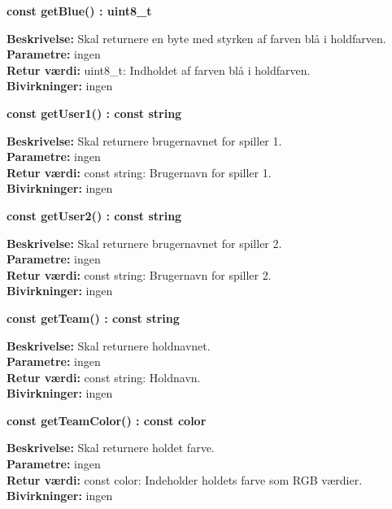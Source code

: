 \documentclass[Arkitektur/System_main.tex]{subfiles}
\begin{document}
\textbf{const getBlue() : uint8\_t}
\begin{adjustwidth}{1cm}{0pt}
\textbf{Beskrivelse:} Skal returnere en byte med styrken af farven blå i holdfarven.\\
\textbf{Parametre:} ingen \\[0.2cm]
\textbf{Retur værdi:} uint8\_t: Indholdet af farven blå i holdfarven.\\[0.2cm]
\textbf{Bivirkninger:} ingen \\[0.2cm]
\end{adjustwidth}

\textbf{const getUser1() : const string}
\begin{adjustwidth}{1cm}{0pt}
\textbf{Beskrivelse:} Skal returnere brugernavnet for spiller 1.\\
\textbf{Parametre:} ingen \\[0.2cm]
\textbf{Retur værdi:} const string: Brugernavn for spiller 1.\\[0.2cm]
\textbf{Bivirkninger:} ingen \\[0.2cm]
\end{adjustwidth}

\textbf{const getUser2() : const string}
\begin{adjustwidth}{1cm}{0pt}
\textbf{Beskrivelse:} Skal returnere brugernavnet for spiller 2.\\
\textbf{Parametre:} ingen \\[0.2cm]
\textbf{Retur værdi:} const string: Brugernavn for spiller 2.\\[0.2cm]
\textbf{Bivirkninger:} ingen \\[0.2cm]
\end{adjustwidth}

\textbf{const getTeam() : const string}
\begin{adjustwidth}{1cm}{0pt}
\textbf{Beskrivelse:} Skal returnere holdnavnet.\\
\textbf{Parametre:} ingen \\[0.2cm]
\textbf{Retur værdi:} const string: Holdnavn.\\[0.2cm]
\textbf{Bivirkninger:} ingen \\[0.2cm]
\end{adjustwidth}

\textbf{const getTeamColor() : const color}
\begin{adjustwidth}{1cm}{0pt}
\textbf{Beskrivelse:} Skal returnere holdet farve.\\
\textbf{Parametre:} ingen \\[0.2cm]
\textbf{Retur værdi:} const color: Indeholder holdets farve som RGB værdier.\\[0.2cm]
\textbf{Bivirkninger:} ingen \\[0.2cm]
\end{adjustwidth}
\end{document}
